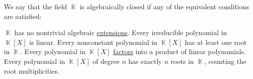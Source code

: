 \begin{definition}\label{def:algebraically_closed_field}
  We say that the field \( \BbbK \) is algebraically closed if any of the equivalent conditions are satisfied:
  \begin{thmenum}
     \( \BbbK \) has no nontrivial algebraic \hyperref[def:transcendental_element]{extensions}.
     Every irreducible polynomial in \( \BbbK[X] \) is linear.
     Every nonconstant polynomial in \( \BbbK[X] \) has at least one root in \( \BbbK \).
     Every polynomial in \( \BbbK[X] \) \hyperref[def:irreducible_factorization]{factors} into a product of linear polynomials.
     Every polynomial in \( \BbbK[X] \) of degree \( n \) has exactly \( n \) roots in \( \BbbK \), counting the root multiplicities.
  \end{thmenum}
\end{definition}
